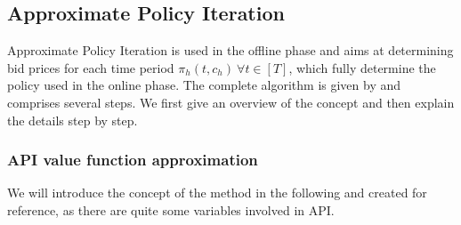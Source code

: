 \subsection{Approximate Policy Iteration}

Approximate Policy Iteration is used in the offline phase and aims at determining bid prices for each time period $\pi_h(t, c_h) ~\forall t \in [T]$, which fully determine the policy used in the online phase. The complete algorithm is given by  and comprises several steps. We first give an overview of the concept and then explain the details step by step.

\subsubsection{API value function approximation}

We will introduce the concept of the method in the following and created  for reference, as there are quite some variables involved in API.

